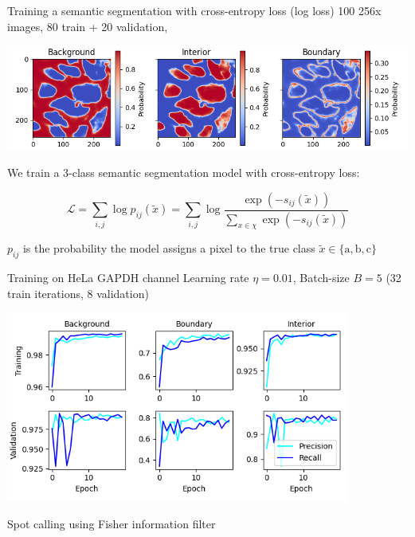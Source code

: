 \documentclass[aspectratio=1610]{beamer}					%
\begin{document}
\begin{frame}{Training a semantic segmentation with cross-entropy loss (log loss)}
\vspace{0.1in}
100 256\;x images, 80 train + 20 validation, 

\begin{center}
\includegraphics[width=1\textwidth]{Softmax.png}
\end{center}

We train a 3-class semantic segmentation model with cross-entropy loss:

\begin{equation*}
\mathcal{L} = \sum_{i,j} \log p_{ij}(\tilde{x}) = \sum_{i,j} \log \frac{\exp(-s_{ij}(\tilde{x}))}{\sum_{x\in\chi} \exp(-s_{ij}(\tilde{x}))}
\end{equation*}

$p_{ij}$ is the probability the model assigns a pixel to the true class $\tilde{x} \in \{\textrm{a}, \textrm{b}, \textrm{c}\}$

\end{frame}

\begin{frame}{Training on HeLa GAPDH channel}
Learning rate $\eta=0.01$, Batch-size $B=5$ (32 train iterations, 8 validation)
\begin{center}
\includegraphics[width=0.85\textwidth]{metrics.png}
\end{center}

\end{frame}

\begin{frame}{Spot calling using Fisher information filter}
\end{frame}
\end{document}
